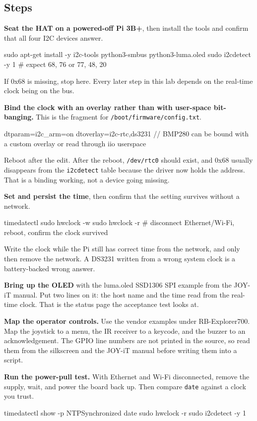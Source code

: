 \subsection*{Steps}

\begin{steps}
\item \textbf{Seat the HAT on a powered-off Pi 3B+}, then install the tools and confirm that all four I2C devices answer.
\begin{shellcode}
sudo apt-get install -y i2c-tools python3-smbus python3-luma.oled
sudo i2cdetect -y 1
# expect 68, 76 or 77, 48, 20
\end{shellcode}
If 0x68 is missing, stop here. Every later step in this lab depends on the real-time clock being on the bus.

\item \textbf{Bind the clock with an overlay rather than with user-space bit-banging.} This is the fragment for \texttt{/boot/firmware/config.txt}.
\begin{dtscode}
dtparam=i2c_arm=on
dtoverlay=i2c-rtc,ds3231
// BMP280 can be bound with a custom overlay or read through iio userspace
\end{dtscode}
Reboot after the edit. After the reboot, \texttt{/dev/rtc0} should exist, and 0x68 usually disappears from the \texttt{i2cdetect} table because the driver now holds the address. That is a binding working, not a device going missing.

\item \textbf{Set and persist the time}, then confirm that the setting survives without a network.
\begin{shellcode}
timedatectl
sudo hwclock -w
sudo hwclock -r
# disconnect Ethernet/Wi-Fi, reboot, confirm the clock survived
\end{shellcode}
Write the clock while the Pi still has correct time from the network, and only then remove the network. A DS3231 written from a wrong system clock is a battery-backed wrong answer.

\item \textbf{Bring up the OLED} with the luma.oled SSD1306 SPI example from the JOY-iT manual. Put two lines on it: the host name and the time read from the real-time clock. That is the status page the acceptance test looks at.

\item \textbf{Map the operator controls.} Use the vendor examples under RB-Explorer700. Map the joystick to a menu, the IR receiver to a keycode, and the buzzer to an acknowledgement. The GPIO line numbers are not printed in the source, so read them from the silkscreen and the JOY-iT manual before writing them into a script.

\item \textbf{Run the power-pull test.} With Ethernet and Wi-Fi disconnected, remove the supply, wait, and power the board back up. Then compare \texttt{date} against a clock you trust.
\begin{shellcode}
timedatectl show -p NTPSynchronized
date
sudo hwclock -r
sudo i2cdetect -y 1
\end{shellcode}
\end{steps}

